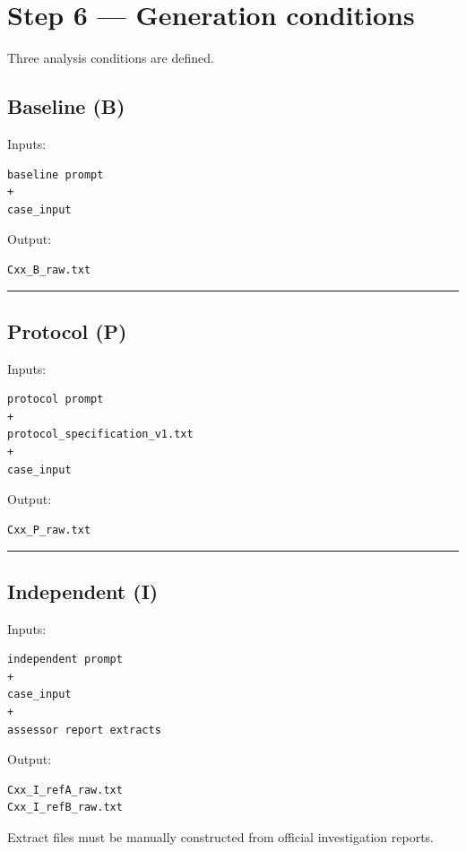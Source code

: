 {\section*{Step 6 — Generation conditions}

Three analysis conditions are defined.

\subsection*{Baseline (B)}

Inputs:

\begin{verbatim}
baseline prompt
+
case_input
\end{verbatim}

Output:

\begin{verbatim}
Cxx_B_raw.txt
\end{verbatim}

\noindent\rule{\textwidth}{0.4pt}

\subsection*{Protocol (P)}

Inputs:

\begin{verbatim}
protocol prompt
+
protocol_specification_v1.txt
+
case_input
\end{verbatim}

Output:

\begin{verbatim}
Cxx_P_raw.txt
\end{verbatim}

\noindent\rule{\textwidth}{0.4pt}

\subsection*{Independent (I)}

Inputs:

\begin{verbatim}
independent prompt
+
case_input
+
assessor report extracts
\end{verbatim}

Output:

\begin{verbatim}
Cxx_I_refA_raw.txt
Cxx_I_refB_raw.txt
\end{verbatim}

Extract files must be manually constructed from official investigation reports.

}
